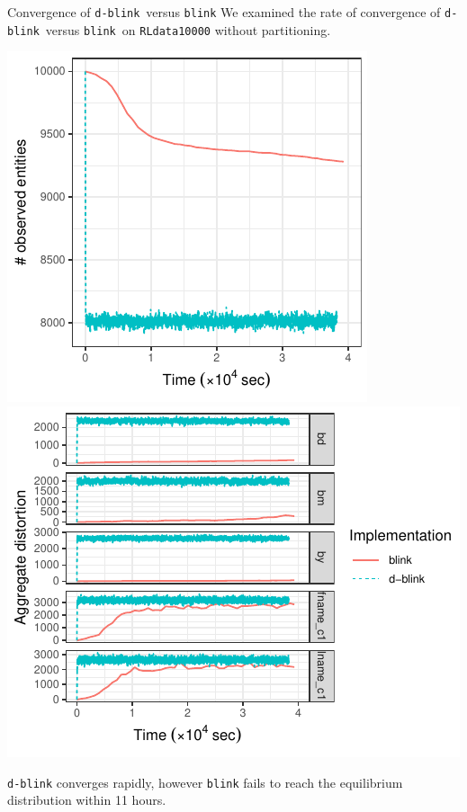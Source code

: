 \documentclass[compress]{beamer}
\newcommand{\dblink}{\texttt{\upshape \lowercase{d-blink}}} %
\newcommand{\blink}{\texttt{\upshape \lowercase{blink}}}
\newcommand{\1}[1]{\mathbb{I}\!\left[#1\right]} %
\theoremstyle{plain}
\begin{document}
\begin{frame}{Convergence of \dblink\ versus \blink}
  We examined the rate of convergence of \dblink\ versus \blink\ 
  on \texttt{RLdata10000} without partitioning.
  
  \begin{center}
    \includegraphics[height=0.45\textheight]{figures/convergence-num-ent-blink-dblink.pdf}
    \hfill
    \includegraphics[height=0.45\textheight]{figures/convergence-agg-dist-blink-dblink.pdf}
  \end{center}

  \texttt{d-blink} converges rapidly, however \texttt{blink} fails to reach 
  the equilibrium distribution within 11 hours.
\end{frame}
\end{document}
